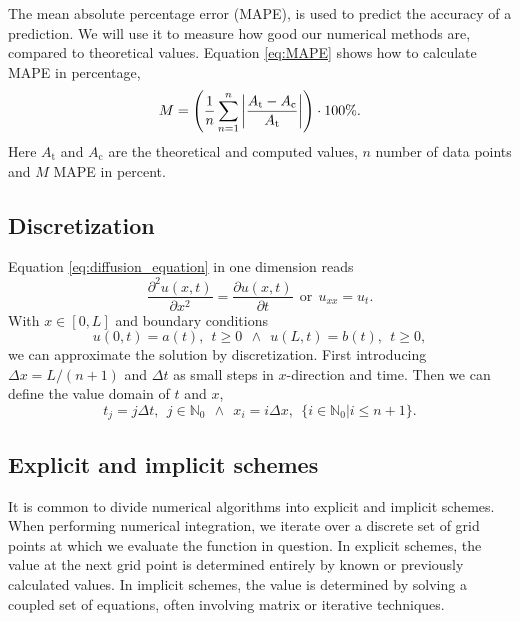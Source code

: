 \documentclass[reprint, english,notitlepage,nofootinbib]{revtex4-1}  %
\begin{document}
The mean absolute percentage error (MAPE), is used to predict the accuracy of a prediction. We will use it to measure how good our numerical methods are, compared to theoretical values. Equation \eqref{eq:MAPE} shows how to calculate MAPE in percentage,
\begin{equation}
	\label{eq:MAPE}
	M = \left(\frac{1}{n}\sum_{n=1}^{n}\abs{\frac{A_\text{t} - A_\text{c}}{A_\text{t}}}\right)\cdot 100\%.
\end{equation}
Here $A_\text{t}$ and $A_\text{c}$ are the theoretical and computed values, $n$ number of data points and $M$ MAPE in percent.

\subsection*{Discretization}

Equation \eqref{eq:diffusion_equation} in one dimension reads
\begin{equation}
\label{eq:diffusion_equation_1D}
\frac{\partial^2u(x, t)}{\partial x^2} = \frac{\partial u(x,t)}{\partial t} \ \ \text{or} \ \ u_{xx} = u_t.
\end{equation}
With $x\in[0,L]$ and boundary conditions
\begin{equation*}
\label{eq:boundary_conditions}
u(0, t) = a(t), \ \ t\geq 0 \ \ \wedge \ \ u(L,t) = b(t), \ \ t\geq 0,
\end{equation*}
we can approximate the solution by discretization. First introducing $\Delta x = L/(n+1)$ and $\Delta t$ as small steps in $x$-direction and time. Then we can define the value domain of $t$ and $x$,
\begin{equation*}
t_j = j\Delta t, \ \ j\in \mathbb{N}_0 \ \ \wedge \ \ x_i = i\Delta x, \ \ \{i \in \mathbb{N}_0 | i \leq n + 1\}.
\end{equation*}

\subsection*{Explicit and implicit schemes}

It is common to divide numerical algorithms into explicit and implicit schemes. When performing numerical integration, we iterate over a discrete set of grid points at which we evaluate the function in question. In explicit schemes, the value at the next grid point is determined entirely by known or previously calculated values. In implicit schemes, the value is determined by solving a coupled set of equations, often involving matrix or iterative techniques.
\end{document}
